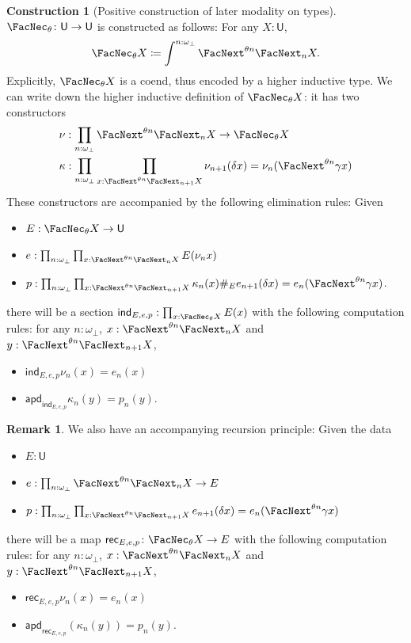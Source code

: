 \documentclass[a4paper,10pt]{amsart}
\theoremstyle{definition}
\newtheorem{remark}{Remark}[section]
\newtheorem{construction}{Construction}[section]
\newcommand{\ms}[1]{\mathsf{#1}}
\newcommand{\ovob}{\omega_\bot}
\newcommand{\bx}{\FacNec}
\newcommand{\Type}{\ms U}
\newcommand{\ind}{\ms{ind}}
\newcommand{\rec}{\ms{rec}}
\newcommand{\apd}{\ms{apd}}
\newcommand{\opm}[1]{\FacNext_{#1}}
\newcommand{\upm}[1]{\FacNext^{#1}}
\begin{document}
\begin{construction}[Positive construction of later modality on types]\label{constype}
  $\bx_\theta \colon \Type \to \Type$ is constructed as follows: For any $X : \Type$, 
  \[ \bx_\theta X \coloneq \int^{n:\ovob}\upm{\theta n} \opm{n} X. \]
  Explicitly, $\bx_\theta X$ is a coend, thus encoded by a higher inductive type. We can write down the higher inductive definition of $\bx_\theta X$: it has two constructors
  \begin{align*}
    &\nu : \prod_{n:\ovob} \upm{\theta n} \opm nX \to \bx_\theta X \\ 
    &\kappa : \prod_{n:\ovob} \prod_{x:\upm{\theta n}\opm{n+1}X} \nu_{n+1}(\delta x) = \nu_n(\upm{\theta n}\gamma x)
  \end{align*}
  These constructors are accompanied by the following elimination rules: Given
  \begin{itemize}
    \item $E : \bx_\theta X \to \Type$
    \item $e : \prod_{n:\ovob}\prod_{x:\upm{\theta n}\opm{n}X}E(\nu_nx)$
    \item $p : \prod_{n:\ovob}\prod_{x:\upm{\theta n}\opm{n+1}X}\kappa_n(x)\#_Ee_{n+1}(\delta x) = e_n(\upm{\theta n}\gamma x)$.
  \end{itemize}
  there will be a section $\ind_{E,e,p} : \prod_{x:\bx_\theta X}E(x)$ with the following computation rules: for any $n:\ovob$, $x:\upm{\theta n}\opm nX$ and $y:\upm{\theta n}\opm{n+1}X$,
  \begin{itemize}
    \item $\ind_{E,e,p} \nu_n(x) = e_n(x)$
    \item $\apd_{\ind_{E,e,p}}\kappa_n(y) = p_n(y)$.
  \end{itemize}
\end{construction}

\begin{remark}\label{recforcoend}
  We also have an accompanying recursion principle: Given the data
  \begin{itemize}
    \item $E : \Type$
    \item $e : \prod_{n:\ovob}\upm{\theta n}\opm{n}X \to E$
    \item $p : \prod_{n:\ovob}\prod_{x:\upm{\theta n}\opm{n+1}X}e_{n+1}(\delta x) = e_n(\upm{\theta n}\gamma x)$
  \end{itemize}
  there will be a map $\rec_{E,e,p} \colon \bx_\theta X \to E$ with the following computation rules: for any $n:\ovob$, $x:\upm{\theta n}\opm{n}X$ and $y:\upm{\theta n}\opm{n+1}X$,
  \begin{itemize}
    \item $\rec_{E,e,p}\nu_n(x) = e_n(x)$
    \item $\apd_{\rec_{E,e,p}}(\kappa_n(y)) = p_n(y)$.
  \end{itemize}
\end{remark}
\end{document}
